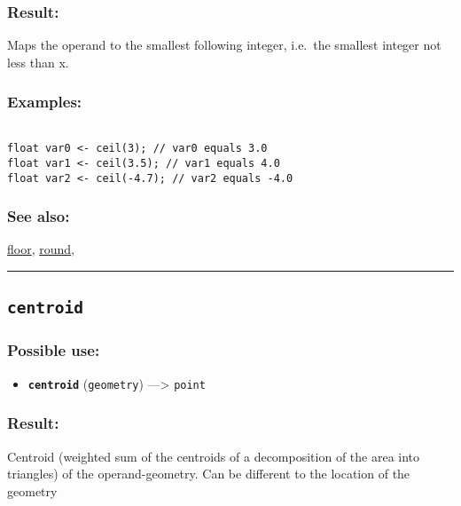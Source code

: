 \documentclass[]{book}
\providecommand{\tightlist}{%
  \setlength{\itemsep}{0pt}\setlength{\parskip}{0pt}}
\theoremstyle{definition}
\theoremstyle{definition}
\theoremstyle{definition}
\theoremstyle{remark}
\begin{document}
\subsubsection{Result:}\label{result-79}

Maps the operand to the smallest following integer, i.e.~the smallest
integer not less than x.

\subsubsection{Examples:}\label{examples-62}

\begin{verbatim}
 
float var0 <- ceil(3); // var0 equals 3.0 
float var1 <- ceil(3.5); // var1 equals 4.0 
float var2 <- ceil(-4.7); // var2 equals -4.0
\end{verbatim}

\subsubsection{See also:}\label{see-also-50}

\href{OperatorsDH\#floor}{floor}, \href{OperatorsNR\#round}{round},

\begin{center}\rule{0.5\linewidth}{\linethickness}\end{center}

\subsection{\texorpdfstring{\texttt{centroid}}{centroid}}\label{centroid}

\subsubsection{Possible use:}\label{possible-use-81}

\begin{itemize}
\tightlist
\item
  \textbf{\texttt{centroid}} (\texttt{geometry}) ---\textgreater{}
  \texttt{point}
\end{itemize}

\subsubsection{Result:}\label{result-80}

Centroid (weighted sum of the centroids of a decomposition of the area
into triangles) of the operand-geometry. Can be different to the
location of the geometry
\end{document}
